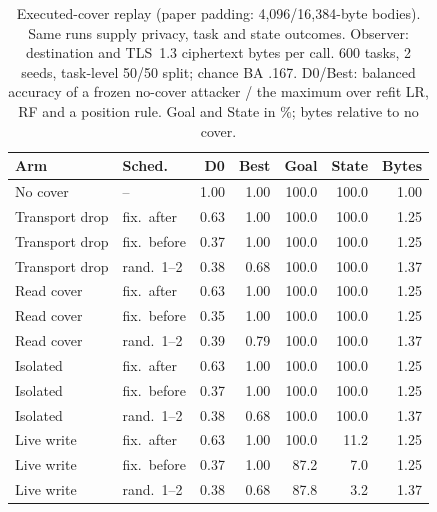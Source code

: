\begin{table}[t]\centering\footnotesize\setlength{\tabcolsep}{3pt}
\caption{Executed-cover replay (paper padding: 4,096/16,384-byte bodies). Same runs supply privacy, task and state outcomes. Observer: destination and TLS~1.3 ciphertext bytes per call. 600 tasks, 2 seeds, task-level 50/50 split; chance BA .167. D0/Best: balanced accuracy of a frozen no-cover attacker / the maximum over refit LR, RF and a position rule. Goal and State in \%; bytes relative to no cover.}\label{tab:m3-cover}
\begin{tabular}{@{}llrrrrr@{}}\toprule
Arm & Sched. & D0 & Best & Goal & State & Bytes\\\midrule
No cover & -- & 1.00 & 1.00 & 100.0 & 100.0 & 1.00\\
Transport drop & fix.\ after & 0.63 & 1.00 & 100.0 & 100.0 & 1.25\\
Transport drop & fix.\ before & 0.37 & 1.00 & 100.0 & 100.0 & 1.25\\
Transport drop & rand.\ 1--2 & 0.38 & 0.68 & 100.0 & 100.0 & 1.37\\
Read cover & fix.\ after & 0.63 & 1.00 & 100.0 & 100.0 & 1.25\\
Read cover & fix.\ before & 0.35 & 1.00 & 100.0 & 100.0 & 1.25\\
Read cover & rand.\ 1--2 & 0.39 & 0.79 & 100.0 & 100.0 & 1.37\\
Isolated & fix.\ after & 0.63 & 1.00 & 100.0 & 100.0 & 1.25\\
Isolated & fix.\ before & 0.37 & 1.00 & 100.0 & 100.0 & 1.25\\
Isolated & rand.\ 1--2 & 0.38 & 0.68 & 100.0 & 100.0 & 1.37\\
Live write & fix.\ after & 0.63 & 1.00 & 100.0 & 11.2 & 1.25\\
Live write & fix.\ before & 0.37 & 1.00 & 87.2 & 7.0 & 1.25\\
Live write & rand.\ 1--2 & 0.38 & 0.68 & 87.8 & 3.2 & 1.37\\
\bottomrule\end{tabular}\end{table}
